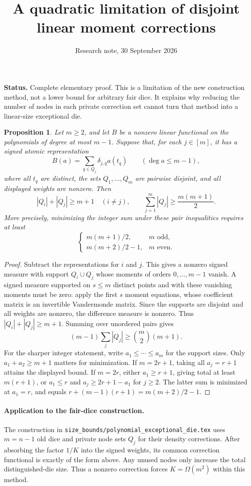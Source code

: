 \documentclass[11pt]{article}
\title{A quadratic limitation of disjoint linear moment corrections}
\author{Research note, 30 September 2026}
\date{}
\newtheorem{proposition}{Proposition}
\begin{document}
\maketitle

\noindent\textbf{Status.} Complete elementary proof. This is a limitation
of the new construction method, not a lower bound for arbitrary fair dice.
It explains why reducing the number of nodes in each private correction
set cannot turn that method into a linear-size exceptional die.

\begin{proposition}\label{prop:barrier}
Let $m\geq2$, and let $B$ be a nonzero linear functional on the polynomials
of degree at most $m-1$. Suppose that, for each $j\in[m]$, it has a signed
atomic representation
\[
 B(a)=\sum_{q\in Q_j}\delta_{j,q}a(t_q)
 \qquad(\deg a\leq m-1),
\]
where all $t_q$ are distinct, the sets $Q_1,\ldots,Q_m$ are pairwise
disjoint, and all displayed weights are nonzero. Then
\[
 |Q_i|+|Q_j|\geq m+1\quad(i\ne j),\qquad
 \sum_{j=1}^m|Q_j|\geq\frac{m(m+1)}2.
\]
More precisely, minimizing the integer sum under these pair inequalities
requires at least
\[
 \begin{cases}
  m(m+1)/2,&m\text{ odd},\\
  m(m+2)/2-1,&m\text{ even}.
 \end{cases}
\]
\end{proposition}
\begin{proof}
Subtract the representations for $i$ and $j$. This gives a nonzero signed
measure with support $Q_i\cup Q_j$ whose moments of orders
$0,\ldots,m-1$ vanish. A signed measure supported on $s\leq m$ distinct
points and with these vanishing moments must be zero: apply the first $s$
moment equations, whose coefficient matrix is an invertible Vandermonde
matrix. Since the supports are disjoint and all weights are nonzero,
the difference measure is nonzero. Thus $|Q_i|+|Q_j|\geq m+1$.
Summing over unordered pairs gives
\[
 (m-1)\sum_j|Q_j|\geq\binom m2(m+1).
\]
For the sharper integer statement, write $a_1\leq\cdots\leq a_m$ for
the support sizes. Only $a_1+a_2\geq m+1$ matters for minimization.
If $m=2r+1$, taking all $a_j=r+1$ attains the displayed bound.
If $m=2r$, either $a_1\geq r+1$, giving total at least $m(r+1)$,
or $a_1\leq r$ and $a_j\geq2r+1-a_1$ for $j\geq2$.
The latter sum is minimized at $a_1=r$, and equals
$r+(m-1)(r+1)=m(m+2)/2-1$.
\end{proof}

\paragraph{Application to the fair-dice construction.}
The construction in
\texttt{size\_bounds/polynomial\_exceptional\_die.tex} uses $m=n-1$ old
dice and private node sets $Q_j$ for their density corrections. After
absorbing the factor $1/K$ into the signed weights, its common correction
functional is exactly of the form above. Any unused nodes only increase
the total distinguished-die size. Thus a nonzero correction forces
$K=\Omega(m^2)$ within this method.
\end{document}
